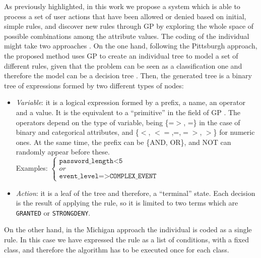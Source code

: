 \documentclass[a4paper,10pt,twocolumn,preprint,3p]{elsarticle}
\begin{document}
As previously highlighted, in this work we propose a system which is
able to process a set of user actions that have been allowed or denied
based on initial, simple rules, and discover new rules through GP by exploring
the whole space of possible combinations among the attribute
values. The coding of the individual might take two approaches \cite{freitas2002data}. On the one hand, following the Pittsburgh approach, the proposed method uses GP to create an individual tree to model a set of different rules, given that the problem can be seen as a
classification one and therefore the model can be a decision tree
\cite{safavian1990survey}. Then, the generated tree is a binary tree
of expressions formed by two different types of nodes:

\begin{itemize}
\item {\em Variable}: it is a logical expression formed by a prefix, a name, an operator and a value. It is the equivalent to a ``primitive'' in the field of GP \cite{back1996evolutionary}. The operators depend on the type of variable, being \{=$>$, =\} in the case of binary and categorical attributes, and \{$<$, $<=$,=,$=>$, $>$\} for numeric ones. At the same time, the prefix can be \{AND, OR\}, and NOT can randomly appear before these. \\
    Examples:
   \begin{math}
     \left \{
   \begin{array}{l}
     \texttt{password\_length<5} \\
     or \\
      \texttt{event\_level=>COMPLEX\_EVENT}
   \end{array}
   \right .
   \end{math}
\item {\em Action}: it is a leaf of the tree and therefore, a ``terminal'' state. Each decision is the result of applying the rule, so it is limited to two terms which are \texttt{GRANTED} or \texttt{STRONGDENY}.
\end{itemize}

On the other hand, in the Michigan approach the individual is coded as a single rule. In this case we have expressed the rule as a list of conditions, with a fixed class, and therefore the algorithm has to be executed once for each class.
\end{document}
